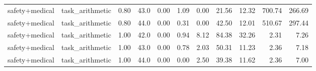 \documentclass{article}
\begin{document}
\begin{table}[H]
{\begin{tabular}{llllrrrrrrr}
safety+medical & task\_arithmetic & 0.80 & 43.0 & 0.00 & 1.09 & 0.00 & 21.56 & 12.32 & 700.74 & 266.69 \\
safety+medical & task\_arithmetic & 0.80 & 44.0 & 0.00 & 0.31 & 0.00 & 42.50 & 12.01 & 510.67 & 297.44 \\
safety+medical & task\_arithmetic & 1.00 & 42.0 & 0.00 & 0.94 & 8.12 & 84.38 & 32.26 & 2.31 & 7.26 \\
safety+medical & task\_arithmetic & 1.00 & 43.0 & 0.00 & 0.78 & 2.03 & 50.31 & 11.23 & 2.36 & 7.18 \\
safety+medical & task\_arithmetic & 1.00 & 44.0 & 0.00 & 0.00 & 2.50 & 39.38 & 11.62 & 2.36 & 7.00 \\
\bottomrule
\end{tabular}
}
\end{table}
\end{document}
